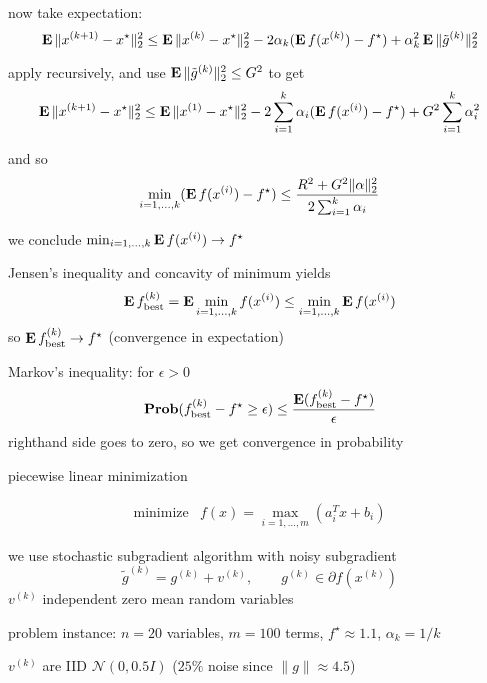 \documentclass[dvips,landscape]{foils}
\renewcommand{\oursection}[1]{
\foilhead[-1.0cm]{#1}
}
\begin{document}
\newpage
now take expectation:
\[
\mathop{\bf E{}} \|x^{(k+1)}-x^\star\|_2^2
\leq \mathop{\bf E{}} \|x^{(k)}-x^\star\|_2^2
            -2\alpha_k (\mathop{\bf E{}} f(x^{(k)})-f^\star)
            +\alpha_k^2 \mathop{\bf E{}} \|\tilde g^{(k)}\|_2^2
\]

apply recursively, and use $\mathop{\bf E{}} \|\tilde g^{(k)}\|_2^2 \leq G^2$
to get
\[
\mathop{\bf E{}} \|x^{(k+1)}-x^\star\|_2^2 \leq
\mathop{\bf E{}}\|x^{(1)}-x^\star\|_2^2
-2\sum_{i=1}^k \alpha_i  (\mathop{\bf E{}} f(x^{(i)})-f^\star)
+G^2\sum_{i=1}^k \alpha_i^2
\]

and so
\[
\min_{i=1,\ldots,k} (\mathop{\bf E{}} f(x^{(i)})-f^\star) \leq
\frac{R^2+G^2\|\alpha\|_2^2}{2 \sum_{i=1}^k \alpha_i}
\]

\newpage
\BIT
\item we conclude
$ \min_{i=1,\ldots,k} \mathop{\bf E{}} f(x^{(i)}) \rightarrow f^\star $

\item
Jensen's inequality and concavity of minimum yields
\[
\mathop{\bf E{}} f^{(k)}_\mathrm{best}
= \mathop{\bf E{}} \min_{i=1,\ldots,k} f(x^{(i)})
\leq \min_{i=1,\ldots,k} \mathop{\bf E{}} f(x^{(i)})
\]
so $\mathop{\bf E{}} f^{(k)}_\mathrm{best} \rightarrow f^\star$
(convergence in expectation)

\item
Markov's inequality: for $\epsilon>0$
\[
\mathop{\bf Prob}(f^{(k)}_\mathrm{best} - f^\star \geq \epsilon) \leq
\frac{\mathop{\bf E{}} (f^{(k)}_\mathrm{best} - f^\star)}{\epsilon}
\]
righthand side goes to zero, so we get convergence in probability
\EIT

\oursection{Example}
piecewise linear minimization

\[
\begin{array}{ll} \mbox{minimize} &
f(x) = \max_{i=1,\ldots,m} (a_i^T x + b_i)
\end{array}
\]

we use stochastic subgradient algorithm with noisy subgradient
\[
\tilde g^{(k)} = g^{(k)} + v^{(k)}, \qquad
g^{(k)}\in \partial f(x^{(k)})
\]
$v^{(k)}$ independent zero mean random variables

\vfill

\newpage
problem instance: $n=20$ variables, $m=100$ terms,
$f^\star \approx 1.1$, $\alpha_k=1/k$

$v^{(k)}$ are IID $\mathcal N(0,0.5I)$ ($25\%$ noise
since $ \|g \| \approx 4.5$)
\end{document}
